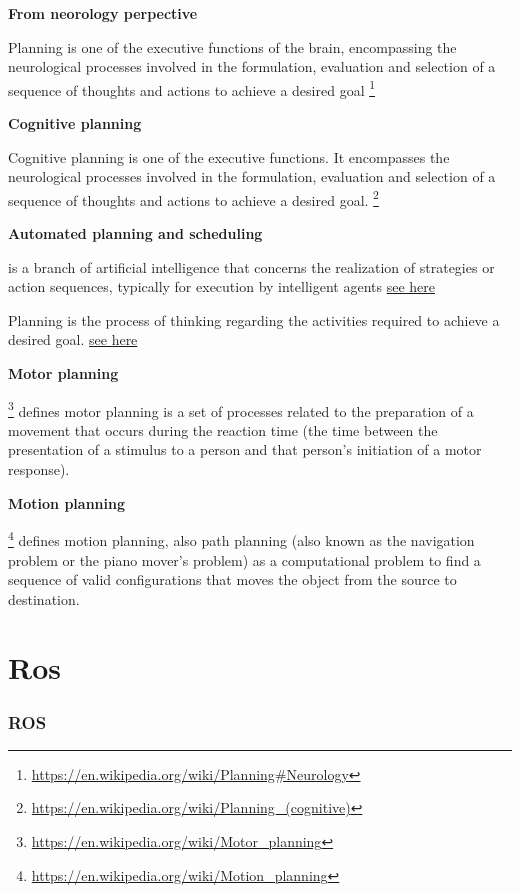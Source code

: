 \documentclass{book}
\newcommand{\seehere}[1]{\href{#1}{see here}}
\providecommand{\ProjectDeepHeading}[2]{%
    \par\medskip\noindent\textbf{#2}\par\smallskip
}
\providecommand{\seehere}[1]{\href{#1}{see here}}
\providecommand{\seeherefooter}[1]{\footnote{\url{#1}}}
\providecommand{\clickurlfooter}[1]{\footnote{\url{#1}}}
\begin{document}
   \ProjectDeepHeading{8}{From neorology perpective}
      Planning is one of the executive functions of the brain, encompassing the neurological processes involved in the formulation, evaluation and selection of a sequence of thoughts and actions to achieve a desired goal
      \seeherefooter{https://en.wikipedia.org/wiki/Planning\#Neurology}


   \ProjectDeepHeading{8}{Cognitive planning}

      Cognitive planning is one of the executive functions. It encompasses the neurological processes involved in the formulation, evaluation and selection of a sequence of thoughts and actions to achieve a desired goal.
      \seeherefooter{https://en.wikipedia.org/wiki/Planning_(cognitive)}


   \ProjectDeepHeading{8}{Automated planning and scheduling}
      is a branch of artificial intelligence that concerns the realization of strategies or action sequences, typically for execution by intelligent agents \seehere{https://en.wikipedia.org/wiki/Automated_planning_and_scheduling}

      Planning is the process of thinking regarding the activities required to achieve a desired goal. \seehere{https://en.wikipedia.org/wiki/Planning}


   \ProjectDeepHeading{8}{Motor planning}
      \clickurlfooter{https://en.wikipedia.org/wiki/Motor_planning} defines motor planning is a set of processes related to the preparation of a movement that occurs during the reaction time (the time between the presentation of a stimulus to a person and that person's initiation of a motor response).


   \ProjectDeepHeading{8}{Motion planning}
      \clickurlfooter{https://en.wikipedia.org/wiki/Motion_planning} defines motion planning, also path planning (also known as the navigation problem or the piano mover's problem) as a computational problem to find a sequence of valid configurations that moves the object from the source to destination.

\section{Ros}


\subsubsection{ROS}
\end{document}
